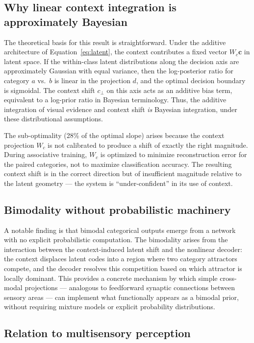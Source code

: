 \documentclass[11pt,a4paper]{article}
\begin{document}
\subsection{Why linear context integration is approximately Bayesian}

The theoretical basis for this result is straightforward.
Under the additive architecture of Equation~\ref{eq:latent}, the context contributes a fixed vector $W_c \mathbf{c}$ in latent space.
If the within-class latent distributions along the decision axis are approximately Gaussian with equal variance, then the log-posterior ratio for category $a$ vs.\ $b$ is linear in the projection $d$, and the optimal decision boundary is sigmoidal.
The context shift $c_\perp$ on this axis acts as an additive bias term, equivalent to a log-prior ratio in Bayesian terminology.
Thus, the additive integration of visual evidence and context shift \emph{is} Bayesian integration, under these distributional assumptions.

The sub-optimality (28\% of the optimal slope) arises because the context projection $W_c$ is not calibrated to produce a shift of exactly the right magnitude.
During associative training, $W_c$ is optimized to minimize reconstruction error for the paired categories, not to maximize classification accuracy.
The resulting context shift is in the correct direction but of insufficient magnitude relative to the latent geometry --- the system is ``under-confident'' in its use of context.

\subsection{Bimodality without probabilistic machinery}

A notable finding is that bimodal categorical outputs emerge from a network with no explicit probabilistic computation.
The bimodality arises from the interaction between the context-induced latent shift and the nonlinear decoder: the context displaces latent codes into a region where two category attractors compete, and the decoder resolves this competition based on which attractor is locally dominant.
This provides a concrete mechanism by which simple cross-modal projections --- analogous to feedforward synaptic connections between sensory areas --- can implement what functionally appears as a bimodal prior, without requiring mixture models or explicit probability distributions.

\subsection{Relation to multisensory perception}
\end{document}

